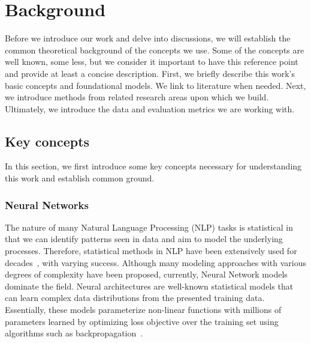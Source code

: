 \chapter{Background}%
\label{chap:background}
Before we introduce our work and delve into discussions, we will establish the common theoretical background of the concepts we use.
Some of the concepts are well known, some less, but we consider it important to have this reference point and provide at least a concise description.
First, we briefly describe this work's basic concepts and foundational models.
We link to literature when needed.
Next, we introduce methods from related research areas upon which we build.
Ultimately, we introduce the data and evaluation metrics we are working with.

\section{Key concepts}
\label{02:sec:basics}
In this section, we first introduce some key concepts necessary for understanding this work and establish common ground.

\subsection{Neural Networks}
\label{background:nns}
The nature of many Natural Language Processing (NLP) tasks is statistical in that we can identify patterns seen in data and aim to model the underlying processes.
Therefore, statistical methods in NLP have been extensively used for decades~\cite{manning99foundations}, with varying success.
Although many modeling approaches with various degrees of complexity have been proposed, currently, Neural Network models dominate the field.
Neural architectures are well-known statistical models \cite{GoodBengCour16} that can learn complex data distributions from the presented training data.
Essentially, these models parameterize non-linear functions with millions of parameters learned by optimizing loss objective over the training set using algorithms such as backpropagation~\cite{kelley1960gradient}.

